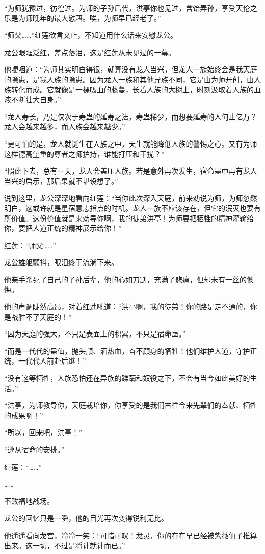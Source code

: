 \begin{this_body}
“为师犹豫过，彷徨过。为师的子孙后代，洪亭你也见过，含饴弄孙，享受天伦之乐是为师晚年的最大慰藉。唉，为师早已经老了。”

“师父……”红莲欲言又止，不知道用什么话来安慰龙公。

龙公眼眶泛红，差点落泪，这是红莲从未见过的一幕。

他哽咽道：“为师其实明白得很，就算没有龙人当兴，但龙人一族始终会是我天庭的隐患，是我人族的隐患。因为龙人一族和其他异族不同，它是由为师开创，由人族转化而成。它就像是一棵吸血的藤蔓，长着人族的大树上，时刻汲取着人族的血液不断壮大自身。”

“龙人寿长，乃是仅次于寿蛊的延寿之法，寿蛊稀少，而想要延寿的人何止亿万？龙人会越来越多，而人族会越来越少。”

“更可怕的是，龙人就诞生在人族之中，天生就能降低人族的警惕之心。又有为师这样德高望重的尊者之师护持，谁能打压和干扰？”

“照此下去，总有一天，龙人会盖压人族。若是意外再次发生，宿命蛊中再有龙人当兴的启示，那后果就不堪设想了。”

说到这里，龙公深深地看向红莲：“当你此次深入天庭，前来劝说为师，为师忽然明白，这或许就是星宿意志指点的时机。龙人一族不应该存在，但它的泯灭也要有所价值。这份价值就是来劝导你啊，我的徒弟洪亭！为师要把牺牲的精神灌输给你，要把人道正统的精神展示给你！”

红莲：“师父……”

龙公雄躯颤抖，眼泪终于流淌下来。

他亲手杀死了自己的子孙后辈，他的心如刀割，充满了悲痛，但却未有一丝的懊悔。

他的声调陡然高昂，对着红莲吼道：“洪亭啊，我的徒弟！你的路是走不通的，你是战胜不了天庭的！”

“因为天庭的强大，不只是表面上的积累，不只是宿命蛊。”

“而是一代代的蛊仙，抛头颅、洒热血，奋不顾身的牺牲！他们维护人道，守护正统，一代代人前赴后继！”

“没有这等牺牲，人族恐怕还在异族的蹂躏和奴役之下，不会有当今如此美好的生活。”

“洪亭，为师教导你，天庭栽培你，你享受的是我们古往今来先辈们的奉献、牺牲的成果啊！”

“所以，回来吧，洪亭！”

“遵从宿命的安排。”

红莲：“……”

……

不败福地战场。

龙公的回忆只是一瞬，他的目光再次变得锐利无比。

他遥遥看向龙宫，冷冷一笑：“可惜可叹！龙灵，你的存在早已经被紫薇仙子推算出来。这一切，不过是将计就计而已。”


\end{this_body}
